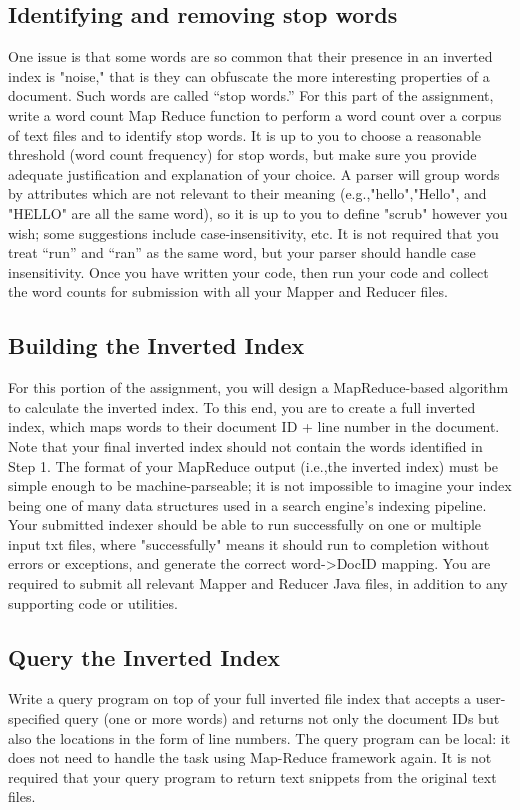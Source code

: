 \subsection{Identifying and removing stop words}
One issue is that some words are so common that their presence in an inverted index is "noise," that is they can obfuscate the more interesting properties of a document. Such words are called “stop words.” For this part of the assignment, write a word count Map Reduce function to perform a word count over a corpus of text files and to identify stop words. It is up to you to choose a reasonable threshold (word count frequency) for stop words, but make sure you provide adequate justification and explanation of your choice. A parser will group words by attributes which are not relevant to their meaning (e.g.,"hello","Hello", and "HELLO" are all the same word), so it is up to you to  define "scrub" however you wish; some suggestions include case-insensitivity, etc. It is not required that you treat “run” and “ran” as the same word, but your parser should handle case insensitivity. Once you have written your code, then run your code and collect the word counts for submission with all your Mapper and Reducer files. 
\subsection{Building the Inverted Index}
For this portion of the assignment, you  will design a MapReduce-based algorithm to calculate the inverted index. To this end, you are to create a full inverted index, which maps words to their document ID + line number in the document. Note that your final inverted index should not contain the words identified in Step 1. The format of your MapReduce output (i.e.,the inverted index) must be simple enough to be machine-parseable; it is not impossible to imagine your index being one of many data structures used  in a search engine's indexing pipeline. Your submitted indexer should be  able to run successfully on one or multiple input txt files, where "successfully" means it should run to completion without errors or exceptions, and generate the correct word->DocID mapping. You are required to submit all relevant Mapper and Reducer Java files, in addition to any supporting code or utilities. 
\subsection{Query the Inverted Index}
Write a query program on top of your full inverted file index that accepts a user-specified query (one or more words) and returns not only the document IDs but also the locations in the form of line numbers. The query program can be local: it does not need to handle the task using Map-Reduce framework again. It is not required that your query program to return text snippets from the original text files.